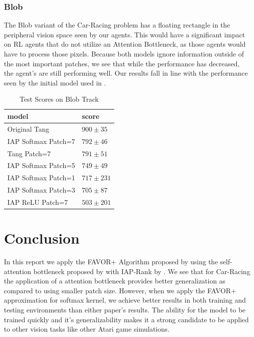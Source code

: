 \documentclass[10pt,twocolumn,letterpaper]{article}
\begin{document}
\subsubsection{Blob}
The Blob variant of the Car-Racing problem has a floating rectangle in the peripheral
vision space seen by our agents. This would have a significant impact on RL agents that
do not utilize an Attention Bottleneck, as those agents would have to process those pixels.
Because both models ignore information outside of the most important patches, we
see that while the performance has decreased, the agent's are still performing well.
Our results fall in line with the performance seen by the initial model used in \cite{Tang}.
\begin{table}[h]
\caption{\label{tab:bar}Test Scores on Blob Track}
\centering
\begin{tabular}{|l|l|}
\hline
model               & score \\ \hline
Original Tang       & $900 \pm 35$  \\ \hline
IAP Softmax Patch=7 & $792 \pm 46$   \\ \hline
Tang Patch=7        & $791 \pm 51$   \\ \hline
IAP Softmax Patch=5 & $749 \pm 49$  \\ \hline
IAP Softmax Patch=1 & $717 \pm 231$  \\ \hline
IAP Softmax Patch=3 & $705 \pm 87$  \\ \hline
IAP ReLU Patch=7    & $503 \pm 201$  \\ \hline
\end{tabular}
\end{table}

\section{Conclusion}
In this report we apply the FAVOR+ Algorithm proposed by \cite{Performers} using the 
self-attention bottleneck proposed by \cite{Tang} with IAP-Rank by \cite{choromanski}. 
We see that for Car-Racing the application of a attention bottleneck provides better 
generalization as compared to using smaller patch size. However, when we apply the 
FAVOR+ approximation for softmax kernel, we achieve better results in both training and
testing environments than either paper's results. The ability for the model to be trained
quickly and it's generalizability makes it a strong candidate to be applied to other 
vision tasks like other Atari game simulations.
\end{document}
